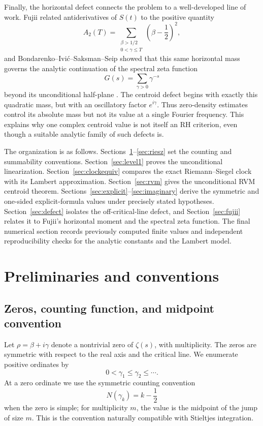 \documentclass[11pt]{amsart}
\numberwithin{equation}{section}
\theoremstyle{definition}
\theoremstyle{remark}
\begin{document}
Finally, the horizontal defect connects the problem to a well-developed line of work.  Fujii related antiderivatives of $S(t)$ to the positive quantity
\[
A_2(T)=\sum_{\substack{\beta>1/2\\0<\gamma\leq T}}
\left(\beta-\frac12\right)^2,
\]
and Bondarenko--Ivić--Saksman--Seip showed that this same horizontal mass governs the analytic continuation of the spectral zeta function
\[
G(s)=\sum_{\gamma>0}\gamma^{-s}
\]
beyond its unconditional half-plane \cite{Fujii2002,BondarenkoIvicSaksmanSeip2019}.  The centroid defect begins with exactly this quadratic mass, but with an oscillatory factor $e^{i\gamma}$.  Thus zero-density estimates control its absolute mass but not its value at a single Fourier frequency.  This explains why one complex centroid value is not itself an RH criterion, even though a suitable analytic family of such defects is.

The organization is as follows.  Sections~\ref{sec:prelim}--\ref{sec:riesz} set the counting and summability conventions.  Section~\ref{sec:level1} proves the unconditional linearization.  Section~\ref{sec:clockequiv} compares the exact Riemann--Siegel clock with its Lambert approximation.  Section~\ref{sec:rvm} gives the unconditional RVM centroid theorem.  Sections~\ref{sec:explicit}--\ref{sec:imaginary} derive the symmetric and one-sided explicit-formula values under precisely stated hypotheses.  Section~\ref{sec:defect} isolates the off-critical-line defect, and Section~\ref{sec:fujii} relates it to Fujii's horizontal moment and the spectral zeta function.  The final numerical section records previously computed finite values and independent reproducibility checks for the analytic constants and the Lambert model.

\section{Preliminaries and conventions}\label{sec:prelim}

\subsection{Zeros, counting function, and midpoint convention}
Let $\rho=\beta+i\gamma$ denote a nontrivial zero of $\zeta(s)$, with multiplicity.  The zeros are symmetric with respect to the real axis and the critical line.  We enumerate positive ordinates by
\[
0<\gamma_1\leq\gamma_2\leq\cdots.
\]
At a zero ordinate we use the symmetric counting convention
\[
N(\gamma_k)=k-\frac12
\]
when the zero is simple; for multiplicity $m$, the value is the midpoint of the jump of size $m$.  This is the convention naturally compatible with Stieltjes integration.
\end{document}
